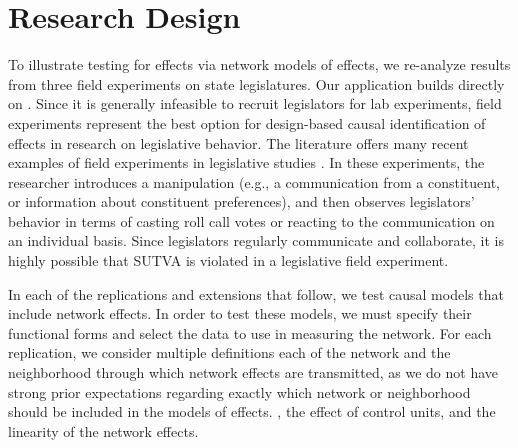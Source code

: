 \documentclass[12pt]{article}
\begin{document}
\section{Research Design}

To illustrate testing for effects via network models of effects, we re-analyze results from three field experiments on state legislatures. Our application builds directly on \citet{coppock2014information}. Since it is generally infeasible to recruit legislators for lab experiments, field experiments represent the best option for design-based causal identification of effects in research on legislative behavior. The literature offers many recent examples of field experiments in legislative studies \citep[e.g., ][]{bergan2009does,butler2011politicians,butler2012field,broockman2013black,nyhan2015effect,bergan2015call}. In these experiments, the researcher introduces a manipulation (e.g., a communication from a constituent, or information about constituent preferences), and then observes legislators' behavior in terms of casting roll call votes or reacting to the communication on an individual basis. Since legislators regularly communicate and collaborate, it is highly possible that SUTVA is violated in a legislative field experiment. 

In each of the replications and extensions that follow, we test causal models that include network effects. In order to test these models, we must specify their functional forms and select the data to use in measuring the network. For each replication, we consider multiple definitions each of the network and the neighborhood through which network effects are transmitted, as we do not have strong prior expectations regarding exactly which network or neighborhood should be included in the models of effects. , the effect of control units, and the linearity of the network effects.  
\end{document}
